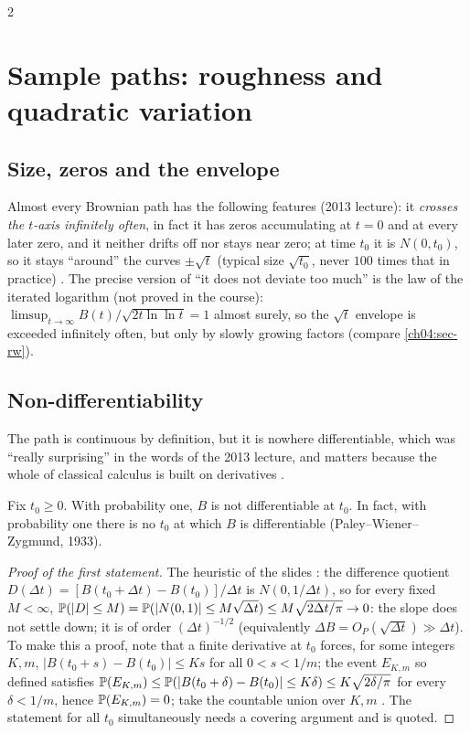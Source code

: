 \begin{paracol}{2}
\section{Sample paths: roughness and quadratic variation}\label{ch11:sec-paths}

\subsection{Size, zeros and the envelope}
Almost every Brownian path has the following features (2013 lecture): it \emph{crosses the $t$-axis infinitely often}, in
fact it has zeros accumulating at $t=0$ and at every later zero, and it neither drifts off nor stays near zero; at time $t_0$
it is $N(0,t_0)$, so it stays ``around'' the curves $\pm\sqrt t$ (typical size $\sqrt{t_0}$, never $100$ times that in
practice) . The precise version of ``it does not deviate too much'' is the law of the
iterated logarithm (not proved in the course): $\limsup_{t\to\infty}B(t)/\sqrt{2t\ln\ln t}=1$ almost surely, so the
$\sqrt t$ envelope is exceeded infinitely often, but only by slowly growing factors (compare \cref{ch04:sec-rw}).

\subsection{Non-differentiability}
The path is continuous by definition, but it is nowhere differentiable, which was ``really surprising'' in the words of the 2013 lecture,
and matters because the whole of classical calculus is built on derivatives .

\begin{proposition}[No derivative]\label{ch11:prop-nodiff}
Fix $t_0\ge0$. With probability one, $B$ is not differentiable at $t_0$. In fact, with probability one there is no
$t_0$ at which $B$ is differentiable (Paley--Wiener--Zygmund, 1933).
\end{proposition}
\begin{proof}[Proof of the first statement]
The heuristic of the slides : the difference quotient $D(\Delta t)=[B(t_0+\Delta t)-B(t_0)]/\Delta t$
is $N(0,1/\Delta t)$, so for every fixed $M<\infty$, $\mathbb{P}(|D|\le M)=\mathbb{P}(|N(0,1)|\le M\sqrt{\Delta t})\le M\sqrt{2\Delta t/\pi}\to0$:
the slope does not settle down; it is of order $(\Delta t)^{-1/2}$ (equivalently $\Delta B=O_P(\sqrt{\Delta t})\gg\Delta t$).
To make this a proof, note that a finite derivative at $t_0$ forces, for some integers $K,m$, $|B(t_0+s)-B(t_0)|\le Ks$ for all
$0<s<1/m$; the event $E_{K,m}$ so defined satisfies $\mathbb{P}(E_{K,m})\le\mathbb{P}(|B(t_0+\delta)-B(t_0)|\le K\delta)\le K\sqrt{2\delta/\pi}$
for every $\delta<1/m$, hence $\mathbb{P}(E_{K,m})=0$; take the countable union over $K,m$ .
The statement for all $t_0$ simultaneously needs a covering argument and is quoted.
\end{proof}


\end{paracol}
